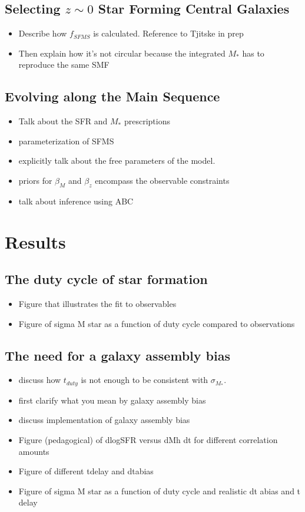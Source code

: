 \documentclass[12pt, letterpaper, preprint]{aastex}
\newcommand{\bitem}{\begin{itemize}}
\newcommand{\eitem}{\end{itemize}}
\begin{document}
\subsection{Selecting $z \sim 0$ Star Forming Central Galaxies}  
\bitem
\item Describe how $f_{SFMS}$ is calculated. Reference to Tjitske in prep 
\item Then explain how it's not circular because the integrated $M_*$ has to reproduce the same SMF
\eitem

\subsection{Evolving along the Main Sequence} 
\bitem
\item Talk about the SFR and $M_*$ prescriptions 
\item parameterization of SFMS 
\item explicitly talk about the free parameters of the model. 
\item priors for $\beta_M$ and $\beta_z$ encompass the observable constraints 
\item talk about inference using ABC
\eitem

\section{Results}
\subsection{The duty cycle of star formation}
\bitem
\item Figure that illustrates the fit to observables 
\item Figure of sigma M star as a function of duty cycle compared to observations 
\eitem 

\subsection{The need for a galaxy assembly bias}
\bitem
\item discuss how $t_{duty}$ is not enough to be consistent with $\sigma_{M_*}$. 
\item first clarify what you mean by galaxy assembly bias 
\item discuss implementation of galaxy assembly bias
\item Figure (pedagogical) of dlogSFR versus dMh dt for different correlation amounts 
\item Figure of different tdelay and dtabias 
\item Figure of sigma M star as a function of duty cycle and realistic dt abias and t delay 
\eitem
\end{document}
